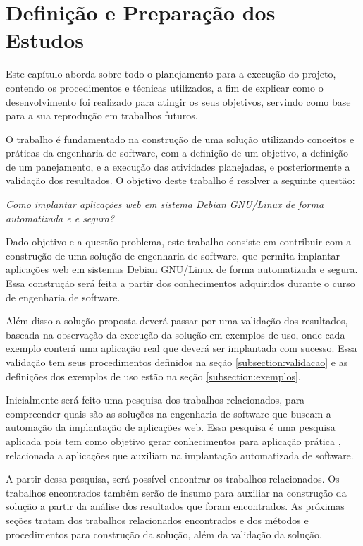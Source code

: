 \chapter{Definição e Preparação dos Estudos}

\label{cap-metodologia}
Este capítulo aborda sobre todo o planejamento para a execução do projeto,
contendo os procedimentos e técnicas utilizados, a fim de
explicar como o desenvolvimento foi realizado para atingir os seus objetivos,
servindo como base para a sua reprodução em trabalhos futuros.

O trabalho é fundamentado na construção de uma solução utilizando conceitos e práticas
da engenharia de software, com a definição de um objetivo, a definição de um panejamento,
e a execução das atividades planejadas, e posteriormente a validação dos resultados.
O objetivo deste trabalho é resolver a seguinte questão:

\begin{center}
  \textit{
  Como implantar aplicações web em sistema Debian GNU/Linux de forma automatizada e
  e segura?
}
\end{center}

Dado objetivo e a questão problema, este trabalho consiste em contribuir
com a construção de uma solução de engenharia de software, que permita implantar
aplicações web em sistemas Debian GNU/Linux de forma automatizada e segura. Essa
construção será feita a partir dos conhecimentos adquiridos durante
o curso de engenharia de software. 

Além disso a solução proposta deverá passar
por uma validação dos resultados, baseada na observação
da execução da solução em exemplos de uso, onde cada exemplo conterá uma aplicação
real que deverá ser implantada com sucesso. Essa validação tem seus procedimentos
definidos na seção \ref{subsection:validacao} e as definições dos exemplos de uso
estão na seção \ref{subsection:exemplos}.

Inicialmente será feito uma pesquisa dos trabalhos relacionados, para compreender
quais são as soluções na engenharia de software que buscam a automação da implantação
de aplicações web. Essa pesquisa é uma pesquisa aplicada pois tem como objetivo
gerar conhecimentos para aplicação prática \cite{gerhardt2009metodos},
relacionada a aplicações que auxiliam na implantação automatizada de software.

A partir dessa pesquisa, será possível encontrar os trabalhos relacionados. Os
trabalhos encontrados também serão de insumo para auxiliar na construção da
solução a partir da análise dos resultados que foram encontrados. As próximas
seções tratam dos trabalhos relacionados encontrados e dos métodos e
procedimentos para construção da solução, além da validação da solução.

